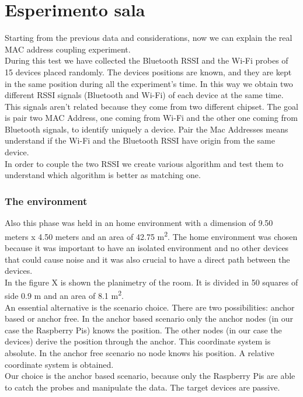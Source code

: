 \section{Esperimento sala}
Starting from the previous data and considerations, now we can explain the real MAC address coupling experiment.\\
\linebreak
During this test we have collected the Bluetooth RSSI and the Wi-Fi probes of 15 devices placed randomly. The devices positions are known, and they are kept in the same position during all the experiment's time. In this way we obtain two different RSSI signals (Bluetooth and Wi-Fi) of each device at the same time. This signals aren't related because they come from two different chipset. The goal is pair two MAC Address, one coming from Wi-Fi and the other one coming from Bluetooth signals, to identify uniquely a device. Pair the Mac Addresses means understand if the Wi-Fi and the Bluetooth RSSI have origin from the same device.\\
\linebreak
In order to couple the two RSSI we create various algorithm and test them to understand which algorithm is better as matching one.

\subsubsection{The environment}
Also this phase was held in an home environment with a dimension of 9.50 meters x 4.50 meters and an area of 42.75 m\textsuperscript{2}.
The home environment was chosen because it was important to have an isolated environment and no other devices that could cause noise and it was also crucial to have a direct path between the devices.\\
In the figure X is shown the planimetry of the room. It is divided in 50 squares of side 0.9 m and an area of 8.1 m\textsuperscript{2}.\\
\linebreak
An essential alternative is the scenario choice. There are two possibilities: anchor based or anchor free. In the anchor based scenario only the anchor nodes (in our case the Raspberry Pis) knows the position. The other nodes (in our case the devices) derive the position through the anchor. This coordinate system is absolute. In the anchor free scenario no node knows his position. A relative coordinate system is obtained.\\
Our choice is the anchor based scenario, because only the Raspberry Pis are able to catch the probes and manipulate the data. The target devices are passive.
